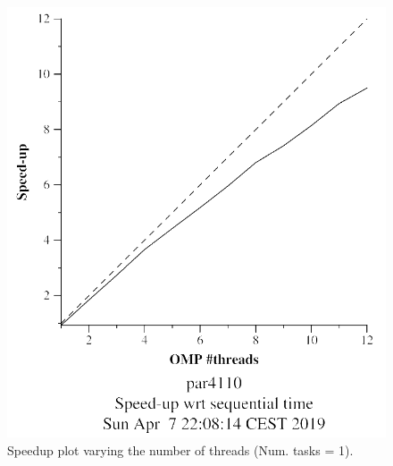 \documentclass[12pt, a4paper]{article}
\begin{document}
\begin{figure}[H]
\begin{minipage}[b]{0.4\linewidth}
  \includegraphics[scale=0.5]{./mandel-omp-10000-strong-omp-24-1-speedup}
  \caption{Speedup plot varying the number of threads (Num. tasks = 1).}
  \label{fig:mandel-omp-10000-strong-omp-24-1-speedup}
\end{minipage}
\end{figure}
\end{document}
